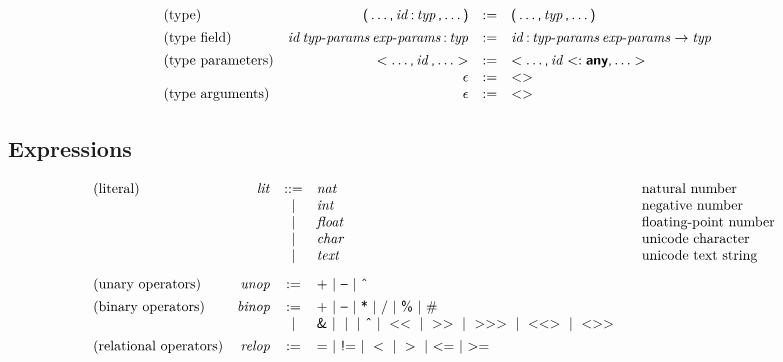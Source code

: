 $$
\begin{array}{@{}lrcl@{}}
\text{(type)} &
\K( \dots \K, \x{id} \K: \x{typ} \K, \dots \K) &:=&
  \K( \dots \K, \x{typ} \K, \dots \K) \\
[1ex]
\text{(type field)} &
\x{id} \x{typ-params} \x{exp-params} \K: \x{typ} &:=&
  \x{id} \K: \x{typ-params} \x{exp-params} \Kto \x{typ} \\
[1ex]
\text{(type parameters)} &
\Klt \dots \K, \x{id} \K, \dots \Kgt &:=&
  \Klt \dots \K, \x{id} \Ksub \KK{any} \K, \dots \Kgt \\&
\epsilon &:=&
  \Klt \Kgt \\
\text{(type arguments)} &
\epsilon &:=&
  \Klt \Kgt \\
\end{array}
$$


\subsection*{Expressions}

$$
\begin{array}{@{}lrcl@{\qquad}l}
\text{(literal)} & \x{lit} &::=&
  \x{nat}
    & \text{natural number} \\&&|&
  \x{int}
    & \text{negative number} \\&&|&
  \x{float}
    & \text{floating-point number} \\&&|&
  \x{char}
    & \text{unicode character} \\&&|&
  \x{text}
    & \text{unicode text string} \\
[2ex]
\text{(unary operators)} & \x{unop} &:=&
  \K{+} ~|~ \K\textendash ~|~ \K{\^{}} \\
[1ex]
\text{(binary operators)} & \x{binop} &:=&
  \K{+} ~|~ \K\textendash ~|~ \K{*} ~|~ \K{/} ~|~ \K{\%} ~|~ \K\# \\&&|&
  \K{\&} ~|~ \;\K\textbar\; ~|~ \K{\^{}} ~|~ \Klt\Klt ~|~ \Kgt\Kgt ~|~ \Kgt\Kgt\Kgt ~|~ \Klt\Klt\Kgt ~|~ \Klt\Kgt\Kgt \\
[1ex]
\text{(relational operators)} & \x{relop} &:=&
  \K= ~|~ \K{!=} ~|~ \Klt ~|~ \Kgt ~|~ {\Klt}{\K=} ~|~ {\Kgt}{\K=} \\
\end{array}
$$

